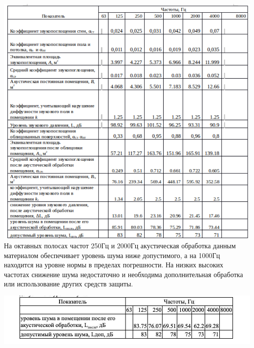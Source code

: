 \documentclass[12pt]{article}
\begin{document}
\includegraphics[width=\linewidth]{2.png}\\

На октавных полосах частот 250Гц и 2000Гц акустическая обработка данным материалом обеспечивает уровень шума ниже допустимого, а на 1000Гц находится на уровне нормы в пределах погрешности. На низких высоких частотах снижение шума недостаточно и необходима дополнительная обработка или использование других средств защиты. 

\includegraphics[width=\linewidth]{1.jpg}\\
\end{document}
